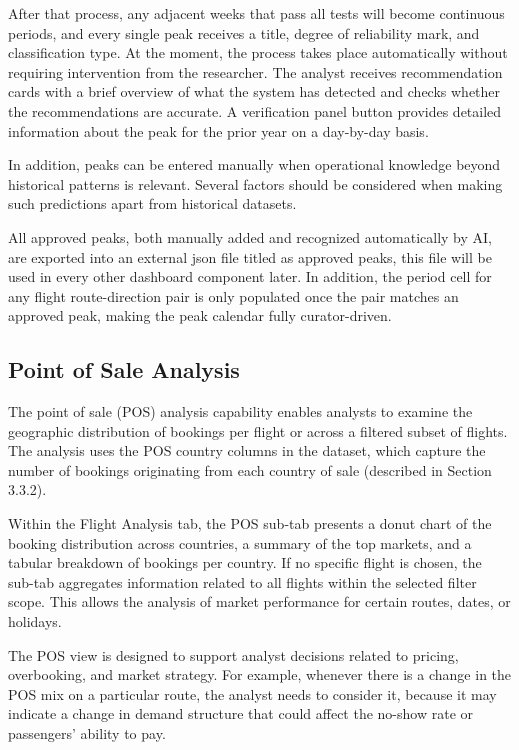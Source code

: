 After that process, any adjacent weeks that pass all tests will become continuous periods, and every single peak receives a title, degree of reliability mark, and classification type. At the moment, the process takes place automatically without requiring intervention from the researcher. The analyst receives recommendation cards with a brief overview of what the system has detected and checks whether the recommendations are accurate. A verification panel button provides detailed information about the peak for the prior year on a day-by-day basis.

In addition, peaks can be entered manually when operational knowledge beyond historical patterns is relevant. Several factors should be considered when making such predictions apart from historical datasets.

All approved peaks, both manually added and recognized automatically by AI, are exported into an external json file titled as approved peaks, this file will be used in every other dashboard component later. In addition, the period cell for any flight route-direction pair is only populated once the pair matches an approved peak, making the peak calendar fully curator-driven.

\subsection{Point of Sale Analysis}

The point of sale (POS) analysis capability enables analysts to examine the geographic distribution of bookings per flight or across a filtered subset of flights. The analysis uses the POS country columns in the dataset, which capture the number of bookings originating from each country of sale (described in Section 3.3.2).

Within the Flight Analysis tab, the POS sub-tab presents a donut chart of the booking distribution across countries, a summary of the top markets, and a tabular breakdown of bookings per country. If no specific flight is chosen, the sub-tab aggregates information related to all flights within the selected filter scope. This allows the analysis of market performance for certain routes, dates, or holidays.

The POS view is designed to support analyst decisions related to pricing, overbooking, and market strategy. For example, whenever there is a change in the POS mix on a particular route, the analyst needs to consider it, because it may indicate a change in demand structure that could affect the no-show rate or passengers' ability to pay.

